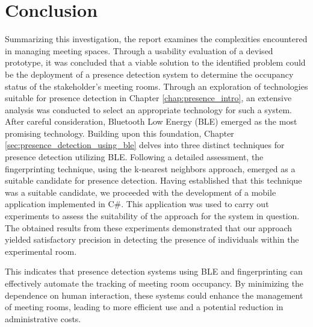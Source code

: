 \chapter{Conclusion}
Summarizing this investigation, the report examines the complexities encountered in managing meeting spaces. 
Through a usability evaluation of a devised prototype, it was concluded that a viable solution to the identified problem could be the deployment of a presence detection system to determine the occupancy status of the stakeholder's meeting rooms.
Through an exploration of technologies suitable for presence detection in Chapter \ref{chap:presence_intro}, an extensive analysis was conducted to select an appropriate technology for such a system.
After careful consideration, Bluetooth Low Energy (BLE) emerged as the most promising technology. 
Building upon this foundation, Chapter \ref{sec:presence_detection_using_ble} delves into three distinct techniques for presence detection utilizing BLE.
Following a detailed assessment, the fingerprinting technique, using the k-nearest neighbors approach, emerged as a suitable candidate for presence detection.
Having established that this technique was a suitable candidate, we proceeded with the development of a mobile application implemented in C#. 
This application was used to carry out experiments to assess the suitability of the approach for the system in question.
The obtained results from these experiments demonstrated that our approach yielded satisfactory precision in detecting the presence of individuals within the experimental room.

This indicates that presence detection systems using BLE and fingerprinting can effectively automate the tracking of meeting room occupancy.
By minimizing the dependence on human interaction, these systems could enhance the management of meeting rooms, leading to more efficient use and a potential reduction in administrative costs.